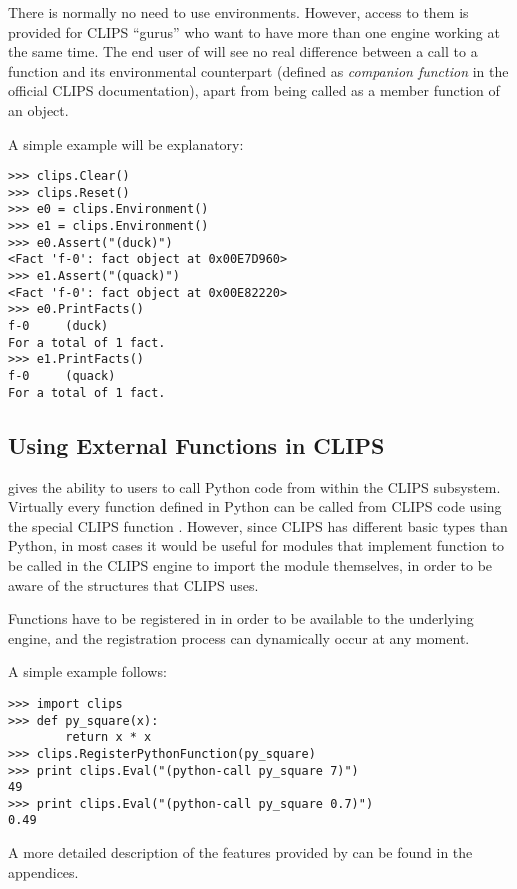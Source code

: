There is normally no need to use environments. However, access to them
is provided for CLIPS ``gurus'' who want to have more than one engine
working at the same time. The end user of \pyclips{} will see no real
difference between a call to a function and its environmental counterpart
(defined as \emph{companion function} in the official CLIPS documentation),
apart from being called as a member function of an 
object.

A simple example will be explanatory:

\begin{verbatim}
>>> clips.Clear()
>>> clips.Reset()
>>> e0 = clips.Environment()
>>> e1 = clips.Environment()
>>> e0.Assert("(duck)")
<Fact 'f-0': fact object at 0x00E7D960>
>>> e1.Assert("(quack)")
<Fact 'f-0': fact object at 0x00E82220>
>>> e0.PrintFacts()
f-0     (duck)
For a total of 1 fact.
>>> e1.PrintFacts()
f-0     (quack)
For a total of 1 fact.
\end{verbatim}


\subsection{Using External Functions in CLIPS\label{pyclips-ov-extfuncs}}

\pyclips{} gives the ability to users to call Python code from within
the CLIPS subsystem. Virtually every function defined in Python can be
called from CLIPS code using the special CLIPS function .
However, since CLIPS has different basic types than Python, in most cases
it would be useful for modules that implement function to be called in
the CLIPS engine to import the \pyclips{} module themselves, in order to
be aware of the structures that CLIPS uses.

Functions have to be registered in \pyclips{} in order to be available
to the underlying engine, and the registration process can dynamically
occur at any moment.

A simple example follows:

\begin{verbatim}
>>> import clips
>>> def py_square(x):
        return x * x
>>> clips.RegisterPythonFunction(py_square)
>>> print clips.Eval("(python-call py_square 7)")
49
>>> print clips.Eval("(python-call py_square 0.7)")
0.49
\end{verbatim}

A more detailed description of the features provided by 
can be found in the appendices.


